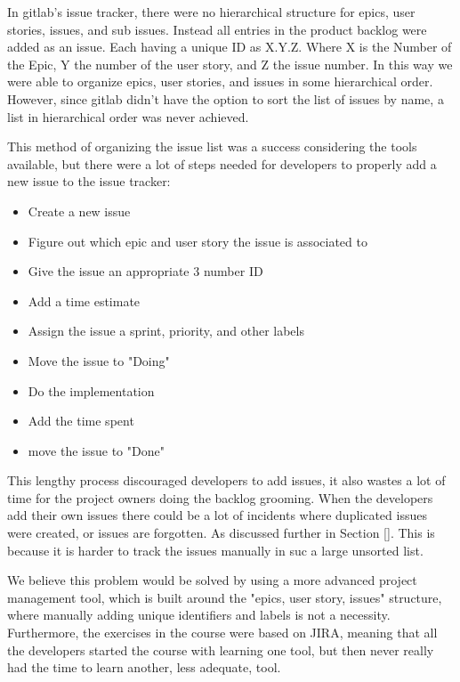 \documentclass{article}
\begin{document}
In gitlab's issue tracker, there were no hierarchical structure for epics, user stories, issues, and sub issues. Instead all entries in the product backlog were added as an issue. Each having a unique ID as X.Y.Z. Where X is the Number of the Epic, Y the number of the user story, and Z the issue number. In this way we were able to organize epics, user stories, and issues in some hierarchical order. However, since gitlab didn't have the option to sort the list of issues by name, a list in hierarchical order was never achieved.

This method of organizing the issue list was a success considering the tools available, but there were a lot of steps needed for developers to properly add a new issue to the issue tracker:

\begin{itemize}
    \item Create a new issue
    \item Figure out which epic and user story the issue is associated to
    \item Give the issue an appropriate 3 number ID
    \item Add a time estimate
    \item Assign the issue a sprint, priority, and other labels
    \item Move the issue to "Doing"
    \item Do the implementation
    \item Add the time spent
    \item move the issue to "Done"
\end{itemize}

This lengthy process discouraged developers to add issues, it also wastes a lot of time for the project owners doing the backlog grooming. When the developers add their own issues there could be a lot of incidents where duplicated issues were created, or issues are forgotten. As discussed further in Section \ref{}. This is because it is harder to track the issues manually in suc a large unsorted list.

We believe this problem would be solved by using a more advanced project management tool, which is built around the "epics, user story, issues" structure, where manually adding unique identifiers and labels is not a necessity. Furthermore, the exercises in the course were based on JIRA, meaning that all the developers started the course with learning one tool, but then never really had the time to  learn another, less adequate, tool.
\end{document}
